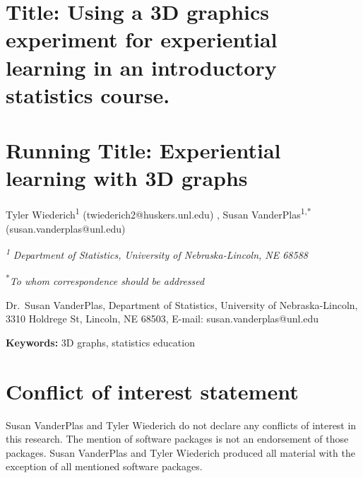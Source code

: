 \documentclass[
  12pt,
]{article}
\date{}
\providecommand{\DIFdel}[1]{} %
\providecommand{\DIFadd}[1]{{\protect\color{blue} \sf #1}} %
\providecommand{\DIFdel}[1]{{\protect\color{red} [..\footnote{removed: #1} ]}} %
\providecommand{\DIFaddbegin}{} %
\providecommand{\DIFaddend}{} %
\providecommand{\DIFdelbegin}{} %
\providecommand{\DIFdelend}{} %
\newcommand{\DIFscaledelfig}{0.5}
\newlength{\DIFdelgraphicswidth} %
\newlength{\DIFdelgraphicsheight} %
\newcommand{\DIFaddincludegraphics}[2][]{{\color{blue}\fbox{\DIFOincludegraphics[#1]{#2}}}} %
\newcommand{\DIFdelincludegraphics}[2][]{%
\sbox{\DIFdelgraphicsbox}{\DIFOincludegraphics[#1]{#2}}%
\settoboxwidth{\DIFdelgraphicswidth}{\DIFdelgraphicsbox} %
\settoboxtotalheight{\DIFdelgraphicsheight}{\DIFdelgraphicsbox} %
\scalebox{\DIFscaledelfig}{%
\parbox[b]{\DIFdelgraphicswidth}{\usebox{\DIFdelgraphicsbox}\\[-\baselineskip] \rule{\DIFdelgraphicswidth}{0em}}\llap{\resizebox{\DIFdelgraphicswidth}{\DIFdelgraphicsheight}{%
\setlength{\unitlength}{\DIFdelgraphicswidth}%
\begin{picture}(1,1)%
\thicklines\linethickness{2pt} %
{\color[rgb]{1,0,0}\put(0,0){\framebox(1,1){}}}%
{\color[rgb]{1,0,0}\put(0,0){\line( 1,1){1}}}%
{\color[rgb]{1,0,0}\put(0,1){\line(1,-1){1}}}%
\end{picture}%
}\hspace*{3pt}}} %
} %
\DeclareRobustCommand{\DIFaddbegin}{\DIFOaddbegin \let\includegraphics\DIFaddincludegraphics} %
\DeclareRobustCommand{\DIFaddend}{\DIFOaddend \let\includegraphics\DIFOincludegraphics} %
\DeclareRobustCommand{\DIFdelbegin}{\DIFOdelbegin \let\includegraphics\DIFdelincludegraphics} %
\DeclareRobustCommand{\DIFdelend}{\DIFOaddend \let\includegraphics\DIFOincludegraphics} %
\begin{document}
\DIFdelbegin \textbf{\DIFdel{Title:}} %
\DIFdel{The use of a 3D graphics experiment as an experiential
learning opportunity in an introductory statistics course
}\DIFdelend \DIFaddbegin \section{\DIFadd{Title: Using a 3D graphics experiment for experiential learning
in an introductory statistics
course.}}\label{title-using-a-3d-graphics-experiment-for-experiential-learning-in-an-introductory-statistics-course.}
\DIFaddend 

\DIFdelbegin \textbf{\DIFdel{Running Title:}} %
\DIFdel{Experiential learning with 3D graphs
}\DIFdelend \DIFaddbegin \section{\DIFadd{Running Title: Experiential learning with 3D
graphs}}\label{running-title-experiential-learning-with-3d-graphs}
\DIFaddend 

Tyler Wiederich\textsuperscript{1} (twiederich2@huskers.unl.edu)\DIFaddbegin \DIFadd{, Susan
VanderPlas\textsuperscript{1,*} (susan.vanderplas@unl.edu)
}\DIFaddend 

\DIFaddbegin \DIFadd{\textsuperscript{\emph{1}} }\DIFaddend \emph{\DIFdelbegin \DIFdel{\textsuperscript{1} }\DIFdelend Department of Statistics, University of
Nebraska-Lincoln, NE 68588}

\textsuperscript{*}\emph{To whom correspondence should be addressed}

Dr.~Susan VanderPlas, Department of Statistics, University of
Nebraska-Lincoln, 3310 Holdrege St, Lincoln, NE 68503, E-mail:
susan.vanderplas@unl.edu

\textbf{Keywords:} 3D graphs, statistics education

\section{Conflict of interest
statement}\label{conflict-of-interest-statement}

Susan VanderPlas and Tyler Wiederich do not declare any conflicts of
interest in this research. The mention of software packages is not an
endorsement of those packages. Susan VanderPlas and Tyler Wiederich
produced all material with the exception of all mentioned software
packages.

\newpage
\end{document}
